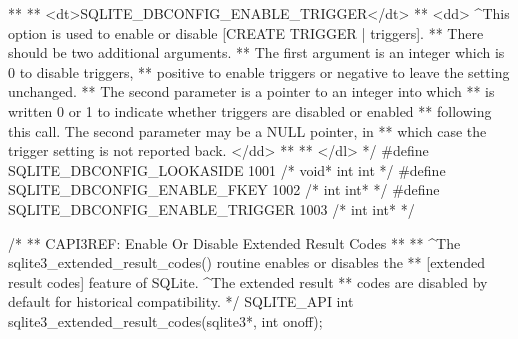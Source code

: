 \begin{Codex}[label=sqlite3.h,numbers=left]
{**
** <dt>SQLITE_DBCONFIG_ENABLE_TRIGGER</dt>
** <dd> ^This option is used to enable or disable [CREATE TRIGGER | triggers].
** There should be two additional arguments.
** The first argument is an integer which is 0 to disable triggers,
** positive to enable triggers or negative to leave the setting unchanged.
** The second parameter is a pointer to an integer into which
** is written 0 or 1 to indicate whether triggers are disabled or enabled
** following this call.  The second parameter may be a NULL pointer, in
** which case the trigger setting is not reported back. </dd>
**
** </dl>
*/
#define SQLITE_DBCONFIG_LOOKASIDE       1001  /* void* int int */
#define SQLITE_DBCONFIG_ENABLE_FKEY     1002  /* int int* */
#define SQLITE_DBCONFIG_ENABLE_TRIGGER  1003  /* int int* */


/*
** CAPI3REF: Enable Or Disable Extended Result Codes
**
** ^The sqlite3_extended_result_codes() routine enables or disables the
** [extended result codes] feature of SQLite. ^The extended result
** codes are disabled by default for historical compatibility.
*/
SQLITE_API int sqlite3_extended_result_codes(sqlite3*, int onoff);

}
\end{Codex}
